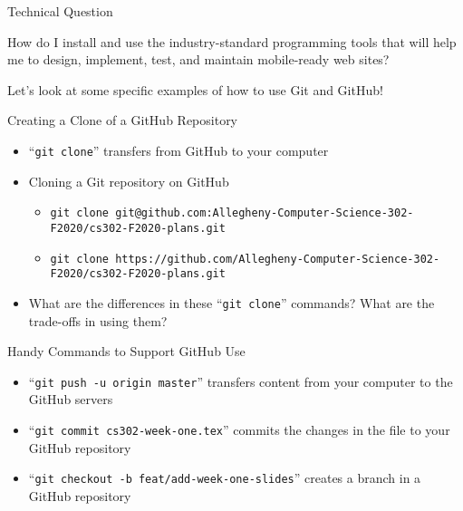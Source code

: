 \documentclass[14pt,aspectratio=169]{beamer}
\begin{document}
%
\begin{frame}{Technical Question}
  \begin{center}
    {\large How do I install and use the industry-standard programming tools
    that will help me to design, implement, test, and maintain mobile-ready web
    sites?}
  \end{center}
  \vspace{2ex}
  \begin{center}
    \small Let's look at some specific examples of how to use Git and GitHub!
  \end{center}
\end{frame}

%
\begin{frame}{Creating a Clone of a GitHub Repository}
  \setlength{\leftmarginii}{0.5cm}
  \begin{itemize}
    \item ``{\tt git clone}'' transfers from GitHub to your computer
    \item Cloning a Git repository on GitHub
      {\tiny
        \begin{itemize}
          \item {\tt git clone git@github.com:Allegheny-Computer-Science-302-F2020/cs302-F2020-plans.git}
          \item {\tt git clone https://github.com/Allegheny-Computer-Science-302-F2020/cs302-F2020-plans.git}
        \end{itemize}
      }
    \item What are the differences in these ``{\tt git clone}'' commands? What are the trade-offs in using them?
  \end{itemize}
\end{frame}

%
\begin{frame}{Handy Commands to Support GitHub Use}
  \begin{itemize}
    \item ``{\tt git push -u origin master}'' transfers content from your computer
      to the GitHub servers
    \item ``{\tt git commit cs302-week-one.tex}'' commits the changes in the
      file to your GitHub repository
    \item ``{\tt git checkout -b feat/add-week-one-slides}'' creates a branch in
      a GitHub repository
  \end{itemize}
\end{frame}
\end{document}

